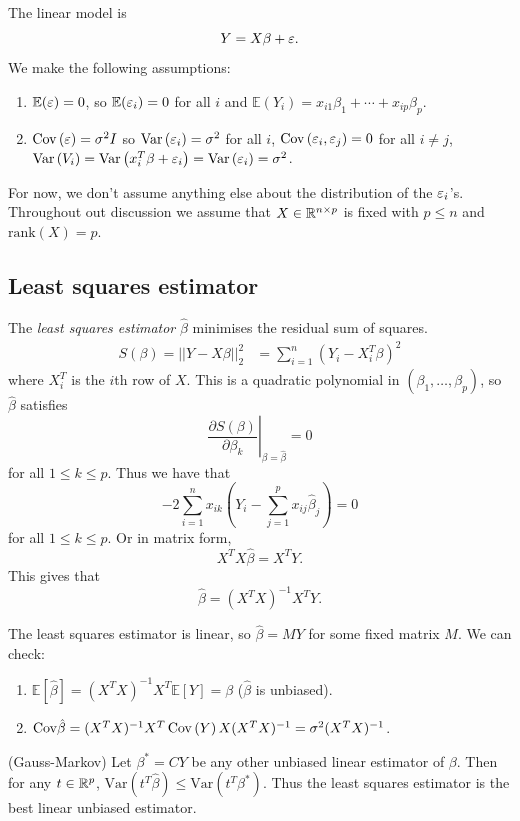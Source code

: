 \documentclass{article}
\begin{document}
The linear model is
\[
  Y = X\beta + \varepsilon.
\]
We make the following assumptions:
\begin{enumerate}
	\item $ \mathbb E(\varepsilon) = 0 $, so $ \mathbb E(\varepsilon_i) = 0 $ for all $ i $ and $ \mathbb E(Y_i) = x_{i1}\beta_1+\cdots + x_{ip}\beta_p $.
	\item $ \operatorname{Cov}\left({\varepsilon}\right) = \sigma^2 I $ so $ \operatorname{Var}\left({\varepsilon_i}\right) = \sigma^2 $ for all $ i $, $ \operatorname{Cov}\left({\varepsilon_i,\varepsilon_j}\right) = 0 $ for all $ i\ne j $, $ \operatorname{Var}\left({V_i}\right) = \operatorname{Var}\left({x_i^T\beta+\varepsilon_i}\right) =\operatorname{Var}\left({\varepsilon_i}\right) = \sigma^2 $.
\end{enumerate}
For now, we don't assume anything else about the distribution of the $ \varepsilon_i $'s. Throughout out discussion we assume that $ X\in \mathbb{R}^{n\times p} $ is fixed with $ p\le n $ and $ \mathrm{rank}(X)=p $.
\subsection{Least squares estimator}
The \textit{least squares estimator} $ \hat\beta $ minimises the residual sum of squares.
\begin{align*}
	S(\beta) = ||Y-X\beta||_2^2 &= \sum_{i=1}^n (Y_i-X_i^T\beta)^2
\end{align*}
where $ X_i^T $ is the $ i $th row of $ X $. This is a quadratic polynomial in $ (\beta_1,\dots, \beta_p) $, so $ \hat\beta $ satisfies
\[
	\left.\frac{\partial S(\beta)}{\partial \beta_k}\right|_{\beta=\hat \beta} =0
\]
for all $ 1\le k\le p $. Thus we have that
\[
	-2\sum_{i=1}^n x_{ik}\left(Y_i-\sum_{j=1}^p x_{ij}\hat \beta_j\right)=0
\]
for all $ 1\le k \le p $. Or in matrix form,
\[
  X^T X\hat\beta = X^T Y.
\]
This gives that 
\[
	\hat\beta = (X^TX)^{-1}X^TY.
\]
\begin{remark}
  The least squares estimator is linear, so $ \hat\beta = MY $ for some fixed matrix $ M $. We can check:
  \begin{enumerate}
	  \item  $\mathbb E[\hat\beta] = (X^TX)^{-1}X^T\mathbb E[Y] = \beta $ \quad ($ \hat\beta $ is unbiased).
	  \item  $ \mathrm{Cov}{\hat\beta}= (X^TX)^{-1}X^T\operatorname{Cov}\left({Y}\right)X(X^TX)^{-1} =\sigma^2(X^TX)^{-1} $.
  \end{enumerate}
\end{remark}
\begin{theorem}
(Gauss-Markov) Let $ \beta^* = CY $ be any other unbiased linear estimator of $ \beta $. Then for any $ t\in \mathbb{R}^p $, $ \mathrm{Var}(t^T\hat\beta) \le \mathrm{Var}(t^T\beta^*) $. Thus the least squares estimator is the best linear unbiased estimator.
\end{theorem}
\end{document}
